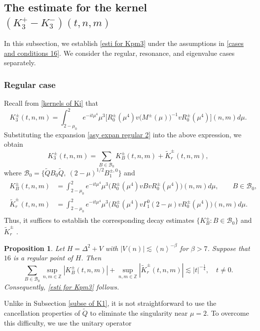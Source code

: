 \documentclass[reqno, 11pt]{amsart}
\newtheorem{proposition}[definition]{Proposition}
\newcommand\Z{\mathbb{Z}}
\newcommand\mcaB{\mathcal{B}}
\numberwithin{equation}{section}
\begin{document}
\subsection{The estimate for the kernel $(K^{+}_3-K^{-}_3)(t,n,m)$}\label{subse of K3}
In this subsection, we establish \eqref{esti for Kpm3} under the assumptions in \eqref{cases and conditions 16}. We consider the regular, resonance, and eigenvalue cases separately.
\subsubsection{{\bf {Regular case}}}
Recall from \eqref{kernels of Ki} that
\begin{equation*}
K^{\pm}_{3}(t,n,m)=\int_{2-\mu_0}^{2}e^{-it\mu^4}\mu^3\big[R^{\pm}_0(\mu^4)v\big(M^{\pm}(\mu)\big)^{-1}vR^{\pm}_0(\mu^4)\big](n,m)d\mu.
\end{equation*}
Substituting the expansion \eqref{asy expan regular 2} into the above expression, we obtain
$$K^{\pm}_{3}(t,n,m)=\sum\limits_{B\in\mcaB_0}K^{\pm}_B(t,n,m)+\widetilde{K}^{\pm}_r(t,n,m),$$
where $\mcaB_0=\{\widetilde{Q}B_{0}\widetilde{Q},\ (2-\mu)^{1/2}B^{\pm,0}_{1}\}$ and
\begin{align}\label{kernels of Kpm3i}
\begin{split}
K^{\pm}_{B}(t,n,m)&=\int_{2-\mu_0}^{2}e^{-it\mu^4}\mu^3\big(R^{\pm}_0(\mu^4)vBvR^{\pm}_0(\mu^4)\big)(n,m)d\mu,\qquad B\in\mcaB_0,\\
\widetilde{K}^{\pm}_{r}(t,n,m)&=\int_{2-\mu_0}^{2}e^{-it\mu^4}\mu^3\big(R^{\pm}_0(\mu^4)v\Gamma^0_{1}(2-\mu)vR^{\pm}_0(\mu^4)\big)(n,m)d\mu.
\end{split}
\end{align}
Thus, it suffices to establish the corresponding decay estimates $\{K^{\pm}_{B}:B\in\mcaB_0\}$ and $\widetilde{K}^{\pm}_r$ .
\begin{proposition}\label{propo of Kpm31}
{ Let $H=\Delta^2+V$ with $|V(n)|\lesssim \left<n\right>^{-\beta}$ for $\beta>7$. Suppose that $16$ is a regular point of $H$. Then 
\begin{equation}\label{estimate of K31}
\sum\limits_{B\in\mcaB_0}\sup\limits_{n,m\in\Z}\left|K^{\pm}_{B}(t,n,m)\right|+\sup\limits_{n,m\in\Z}\left|\widetilde{K}^{\pm}_{r}(t,n,m)\right|\lesssim |t|^{-\frac{1}{4}},\quad t\neq0.
\end{equation}
Consequently, \eqref{esti for Kpm3} follows.
}
\end{proposition}
Unlike in Subsection \ref{subse of K1}, it is not straightforward to use the cancellation properties of $\widetilde{Q}$ to eliminate the singularity near $\mu=2$. To overcome this difficulty, we use the unitary operator
\end{document}
